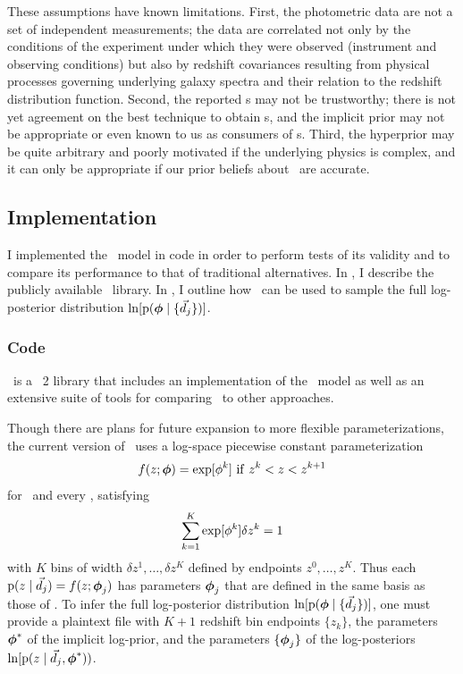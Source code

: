 These assumptions have known limitations.  
First, the photometric data are not a set of independent measurements; the data are correlated not only by the conditions of the experiment under which they were observed (instrument and observing conditions) but also by redshift covariances resulting from physical processes governing underlying galaxy spectra and their relation to the redshift distribution function.
Second, the reported \pzip s may not be trustworthy; there is not yet agreement on the best technique to obtain \pzpdf s, and the implicit prior may not be appropriate or even known to us as consumers of \pzip s.  
Third, the hyperprior may be quite arbitrary and poorly motivated if the underlying physics is complex, and it can only be appropriate if our prior beliefs about \nz\ are accurate.

\subsection{Implementation}

I implemented the \Chippr\ model in code in order to perform tests of its validity and to compare its performance to that of traditional alternatives.
In , I describe the publicly available \chippr\ library.
In , I outline how \chippr\ can be used to sample the full log-posterior distribution $\ln[\mathrm{p}({\boldsymbol{\phi}} \mid \{\vec{d}_{j}\})]$.

\subsubsection{Code}

\chippr\ is a \python\ 2 library that includes an implementation of the \Chippr\ model as well as an extensive suite of tools for comparing \Chippr\ to other approaches.

Though there are plans for future expansion to more flexible parameterizations, the current version of \chippr\ uses a log-space piecewise constant parameterization
\begin{equation}
\eqlabel{eqn:logstepfunc}
f(z; \ndphi) = \exp[\phi^{k}]\ \mathrm{if}\ z^{k} < z < z^{k+1}
\end{equation}
for \nz\ and every \pzpdf, satisfying
\begin{equation}
\eqlabel{eqn:logstepfuncnorm}
\sum_{k=1}^{K} \exp[\phi^{k}] \delta z^{k} = 1
\end{equation}
with $K$ bins of width $\delta z^{1}, \dots, \delta z^{K}$ defined by endpoints $z^{0}, \dots, z^{K}$.
Thus each $\mathrm{p}(z \mid \vec{d}_{j}) = f(z; {\boldsymbol{\phi}}_{j})$ has parameters ${\boldsymbol{\phi}}_{j}$ that are defined in the same basis as those of \nz.
To infer the full log-posterior distribution $\ln[\mathrm{p}({\boldsymbol{\phi}} \mid \{\vec{d}_{j}\})]$, one must provide a plaintext file with $K+1$ redshift bin endpoints $\{z_{k}\}$, the parameters ${\boldsymbol{\phi}}^{*}$ of the implicit log-prior, and the parameters $\{{\boldsymbol{\phi}}_{j}\}$ of the log-posteriors $\ln[\mathrm{p}(z \mid \vec{d}_{j}, {\boldsymbol{\phi}}^{*}))$.

